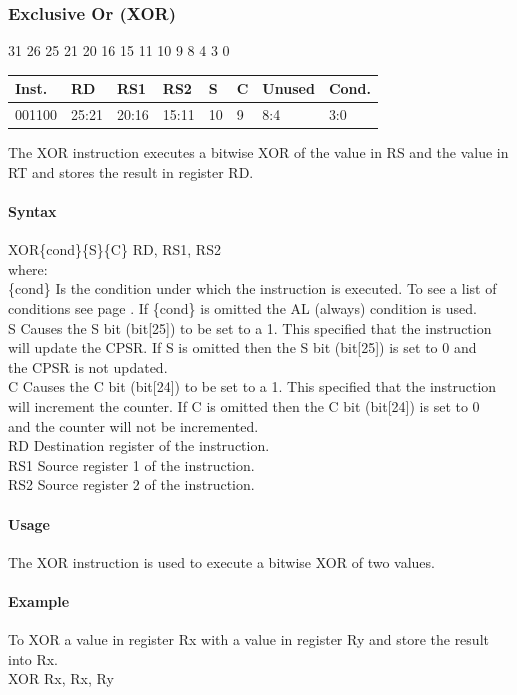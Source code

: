 \documentclass[12pt]{article}
\newcommand{\aTypeInstruction}[6]
{%
    \hspace{1.6cm}31 \hspace{1.15cm}26 \hspace{.04cm}25 \hspace{.8cm}21 \hspace{.04cm}20 \hspace{.8cm}16 \hspace{.04cm}15 \hspace{.8cm}11 \hspace{.04cm}10 \hspace{.275cm}9 \hspace{.275cm}8 \hspace{1.175cm}4 \hspace{.04cm}3 \hspace{1.25cm}0
    \vspace{-.25cm}
    \begin{center}
        \begin{tabular}{ |p{1.8cm}|p{1.5cm}|p{1.5cm}|p{1.5cm}|p{0.3cm}|p{0.3cm}|p{1.5cm}|p{1.5cm}| }
            \hline
            \textbf{Inst.} & \textbf{RD}& \textbf{RS1} & \textbf{RS2} & \textbf{S} & \textbf{C} & Unused & \textbf{Cond.}\\
            \hline
            #1 & 25:21 & 20:16 & 15:11 & 10 & 9 & 8:4 &3:0\\
            \hline
        \end{tabular}
    \end{center}
    
    \noindent
    #2\\
    
    \paragraph{Syntax}
    \begin{flushleft}
    #3\{cond\}\{S\}\{C\} RD, RS1, RS2\\
    \vspace{1em}        %
    where:\\
    \vspace{1em}
    \{cond\}    \hspace{2em} Is the condition under which the instruction is executed. To see a list of\\
                \hspace{5.4em} conditions see page . If \{cond\} is omitted the AL (always) condition is used.\\
    \vspace{1em}    
    S       \hspace{4.5em} Causes the S bit (bit[25]) to be set to a 1. This specified that the instruction\\
            \hspace{5.4em} will update the CPSR. If S is omitted then the S bit (bit[25]) is set to 0 and\\
            \hspace{5.4em} the CPSR is not updated.\\
    \vspace{1em}    
    C       \hspace{4.5em} Causes the C bit (bit[24]) to be set to a 1. This specified that the instruction\\
            \hspace{5.4em} will increment the counter. If C is omitted then the C bit (bit[24]) is set to 0\\
            \hspace{5.4em} and the counter will not be incremented.\\
    \vspace{1em}
    RD  \hspace{3.6em} Destination register of the instruction.\\
    \vspace{1em}
    RS1  \hspace{3.35em} Source register 1 of the instruction.\\
    \vspace{1em}
    RS2  \hspace{3.35em} Source register 2 of the instruction.\\
    \end{flushleft}
    
    \paragraph{Usage}
    \begin{flushleft}
    #4\\
    \end{flushleft}
    \paragraph{Example}
    \begin{flushleft}
    #5\\
    \vspace{1em}
    #6
    \end{flushleft}
    }
\begin{document}
   
   




    \newpage
    \subsubsection{Exclusive Or (XOR)}
    
    \aTypeInstruction
    {001100}
    {The XOR instruction executes a bitwise XOR of the value in RS and the value in RT and stores the result in register RD.}
    {XOR}
    {The XOR instruction is used to execute a bitwise XOR of two values.}
    {To XOR a value in register Rx with a value in register Ry and store the result into Rx.}
    {XOR Rx, Rx, Ry}
    
    
\end{document}
